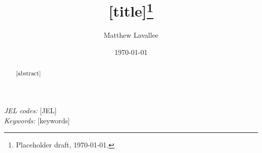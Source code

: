 \documentclass[12pt]{article}
\title{[title]\thanks{Placeholder draft, \today.}}
\author{Matthew Lavallee}
\date{\today}
\begin{document}
\onehalfspacing
\maketitle

\begin{abstract}
[abstract]
\end{abstract}

\noindent\textit{JEL codes:} [JEL]\\
\textit{Keywords:} [keywords]
\thispagestyle{empty}
\end{document}
